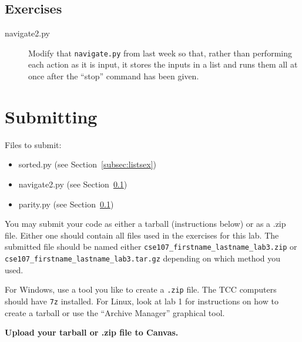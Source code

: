\documentclass[11pt]{cselabheader}
\begin{document}
\subsection{Exercises}
\label{subsec:forex}

\begin{description}
  \item[navigate2.py] Modify that \lstinline{navigate.py} from last week so that, rather than performing each action as it is input, it stores the inputs in a list and runs them all at once after the ``stop'' command has been given.
\end{description}

\pagebreak
\section{Submitting}

Files to submit:
\begin{itemize}
  \item sorted.py (see Section~\ref{subsec:listsex})
  \item navigate2.py (see Section~\ref{subsec:forex})
  \item parity.py (see Section~\ref{subsec:forex})
\end{itemize}

You may submit your code as either a tarball (instructions below) or as a .zip
file. Either one should contain all files used in the exercises for this lab.
The submitted file should be named either
\texttt{cse107\_firstname\_lastname\_lab3.zip} or
\texttt{cse107\_firstname\_lastname\_lab3.tar.gz} depending on which method you
used.

For Windows, use a tool you like to create a \texttt{.zip} file. The TCC computers should
have \texttt{7z} installed. For Linux, look at lab 1 for instructions on how to
create a tarball or use the ``Archive Manager'' graphical tool.

\begin{center}
  \textbf{Upload your tarball or .zip file to Canvas.}
\end{center}
\end{document}
